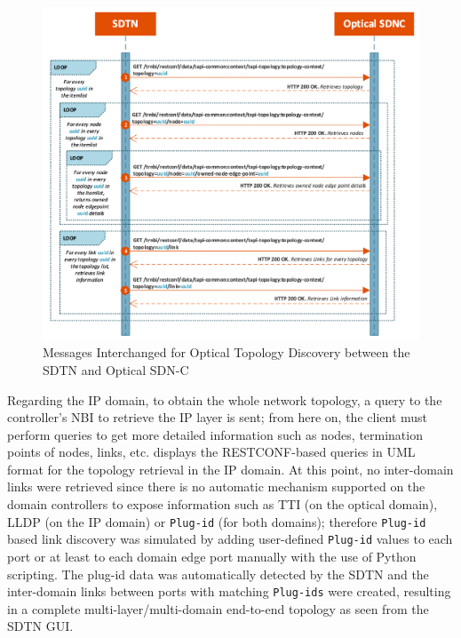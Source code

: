 \documentclass[a4paper,fleqn]{cas-dc}
\begin{document}
\begin{figure}
	\centering
		\includegraphics[width=\linewidth]{figs/optical_topology_workflow_2.png}
	\caption{Messages Interchanged for Optical Topology Discovery between the SDTN and Optical SDN-C}
	\label{FIG:optical_topology_workflow}
\end{figure}

Regarding the IP domain, to obtain the whole network topology, a query to the controller’s NBI to retrieve the IP layer is sent; from here on, the client must perform queries to get more detailed information such as nodes, termination points of nodes, links, etc.  displays the RESTCONF-based queries in UML format for the topology retrieval in the IP domain. 
At this point, no inter-domain links were retrieved since there is no automatic mechanism supported on the domain controllers to expose information such as TTI (on the optical domain), LLDP (on the IP domain) or \texttt{Plug-id} (for both domains); therefore \texttt{Plug-id} based link discovery was simulated by adding user-defined \texttt{Plug-id} values to each port or at least to each domain edge port manually with the use of Python scripting. The plug-id data was automatically detected by the SDTN and the inter-domain links between ports with matching \texttt{Plug-ids} were created, resulting in a complete multi-layer/multi-domain end-to-end topology as seen from the SDTN GUI.

\end{document}
